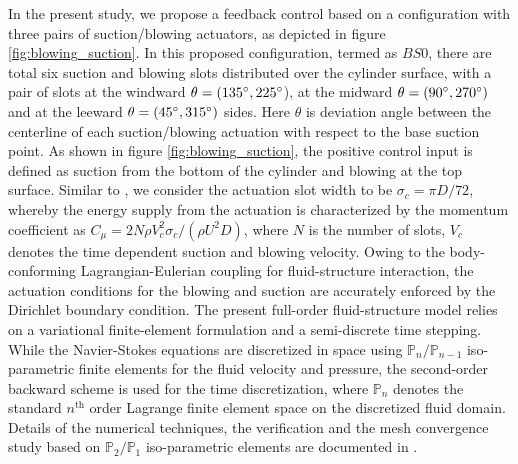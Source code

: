 \documentclass[standard]{jfm}
\begin{document}
In the present study,  we propose a feedback control based on  
a configuration with three pairs of suction/blowing actuators,
 as depicted in figure \ref{fig:blowing_suction}. 
%
In this proposed configuration, termed as $BS0$, there 
are total six suction and blowing slots distributed over the cylinder surface, 
with a pair of slots at the windward $\theta=(135 \degree, 225 \degree$), 
at the midward $\theta=(90 \degree, 270 \degree)$
and at the leeward $\theta=(45 \degree, 315 \degree)$ sides. 
Here  $\theta$ is deviation angle between the centerline of each suction/blowing 
actuation with respect to the base suction point.
As shown in figure \ref{fig:blowing_suction}, the positive control input is defined as 
suction from the bottom of the cylinder and blowing at the top surface. 
Similar to \cite{pastoor2008}, we consider the actuation slot width to be 
$\sigma_{c}=\pi D/72$, whereby the energy supply from the actuation 
is characterized by the momentum coefficient as
$C_\mu = {2 N \rho V^2_{c} \sigma_c}/{(\rho U^2 D)}$, 
where $N$ is the number of slots, $V_c$ denotes the time dependent 
suction and blowing velocity. 
Owing to the body-conforming Lagrangian-Eulerian coupling for fluid-structure interaction, 
the actuation conditions for the blowing and suction are accurately enforced by 
the Dirichlet boundary condition.
%  
The present full-order fluid-structure model relies on 
a variational finite-element formulation and a semi-discrete time stepping.
While the Navier-Stokes equations are discretized in space 
using $\mathbb{P}_{n}/\mathbb{P}_{n-1}$ iso-parametric finite elements 
for the fluid velocity and pressure, 
the second-order backward scheme is used for the time discretization, where 
$\mathbb{P}_{n}$ denotes the standard $n^\mathrm{th}$
order Lagrange finite element space on the discretized fluid domain. 
%
Details of the numerical techniques, the verification and the mesh convergence study 
based on $\mathbb{P}_{2}/\mathbb{P}_{1}$ 
iso-parametric elements are documented in \cite{YaoJFM2016}.
\end{document}
